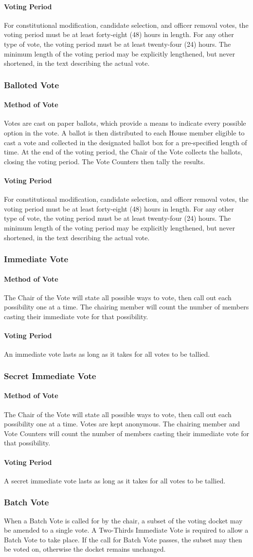\documentclass{article}
\newcommand{\asubsection}[1]{\subsubsection{#1} \label{#1}}
\newcommand{\asubsubsection}[1]{\paragraph{#1} \label{#1}}
\begin{document}
\asubsubsection{Voting Period}
For constitutional modification, candidate selection, and officer removal votes, the voting period must be at least forty-eight (48) hours in length.
For any other type of vote, the voting period must be at least twenty-four (24) hours.
The minimum length of the voting period may be explicitly lengthened, but never shortened, in the text describing the actual vote.
\asubsection{Balloted Vote}
\asubsubsection{Method of Vote}
Votes are cast on paper ballots, which provide a means to indicate every possible option in the vote.
A ballot is then distributed to each House member eligible to cast a vote and collected in the designated ballot box for a pre-specified length of time.
At the end of the voting period, the Chair of the Vote collects the ballots, closing the voting period.
The Vote Counters then tally the results.
\asubsubsection{Voting Period}
For constitutional modification, candidate selection, and officer removal votes, the voting period must be at least forty-eight (48) hours in length.
For any other type of vote, the voting period must be at least twenty-four (24) hours.
The minimum length of the voting period may be explicitly lengthened, but never shortened, in the text describing the actual vote.
\asubsection{Immediate Vote}
\asubsubsection{Method of Vote}
The Chair of the Vote will state all possible ways to vote, then call out each possibility one at a time.
The chairing member will count the number of members casting their immediate vote for that possibility.
\asubsubsection{Voting Period}
An immediate vote lasts as long as it takes for all votes to be tallied.
\asubsection{Secret Immediate Vote}
\asubsubsection{Method of Vote}
The Chair of the Vote will state all possible ways to vote, then call out each possibility one at a time.
Votes are kept anonymous.
The chairing member and Vote Counters will count the number of members casting their immediate vote for that possibility.
\asubsubsection{Voting Period}
A secret immediate vote lasts as long as it takes for all votes to be tallied.
\asubsection{Batch Vote}
When a Batch Vote is called for by the chair, a subset of the voting docket may be amended to a single vote.
A Two-Thirds Immediate Vote is required to allow a Batch Vote to take place.
If the call for Batch Vote passes, the subset may then be voted on, otherwise the docket remains unchanged.
\end{document}

